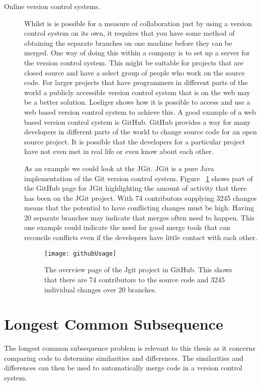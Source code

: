 \begin{description}
  \item [Online version control systems.]  
  Whilst is is possible for a measure of collaboration just by using a version control system on its own, it requires that you have some method of obtaining the separate branches on one machine before they can be merged.
  One way of doing this within a company is to set up a server for the version control system.
  This might be suitable for projects that are closed source and have a select group of people who work on the source code.
  For larger projects that have programmers in different parts of the world a publicly accessible version control system that is on the web may be a better solution.
  Loeliger \cite{Loeliger2006} shows how it is possible to access and use a web based version control system to achieve this.
  A good example of a web based version control system is GitHub.
  GitHub provides a way for many developers in different parts of the world to change source code for an open source project.
  It is possible that the developers for a particular project have not even met in real life or even know about each other.

  As an example we could look at the JGit.
  JGit is a pure Java implementation of the Git version control system.
  Figure ~\ref{fig:bgUsage} shows part of the GitHub page for JGit highlighting the amount of activity that there has been on the JGit project.
  With 74 contributors supplying 3245 changes means that the potential to have conflicting changes must be high. Having 20 separate branches may indicate that merges often need to happen. This one example could indicate the need for good merge tools that can reconcile conflicts even if the developers have little contact with each other.

  \begin{figure}[!t]
   \begin{center}
    \texttt{[image: githubUsage]}
   \end{center}
   \caption{The overview page of the Jgit project in GitHub. This shows that there are 74 contributors to the source code and 3245 individual changes over 20 branches.}
   \label{fig:bgUsage}
  \end{figure}


  
\end{description}

\section{Longest Common Subsequence}
The longest common subsequence problem is relevant to this thesis as it concerns comparing code to determine similarities and differences.
The similarities and differences can then be used to automatically merge code in a version control system.

